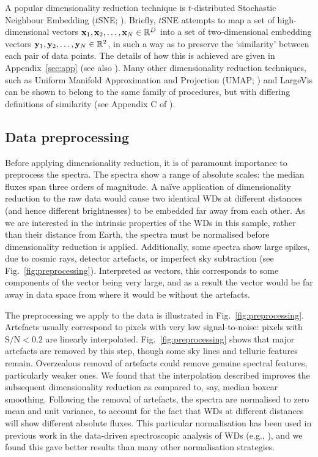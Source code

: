\documentclass[fleqn,usenatbib]{mnras}
\def\xb{\vb{x}}
\def\yb{\vb{y}}
\begin{document}
A popular dimensionality reduction technique is $t$-distributed Stochastic Neighbour Embedding ($t$SNE; \citealt{tsne}).
Briefly, $t$SNE attempts to map a set of high-dimensional vectors $\xb_1, \xb_2, \dots, \xb_N \in \mathbb{R}^D$ into a set of two-dimensional embedding vectors $\yb_1, \yb_2, \dots, \yb_N \in \mathbb{R}^2$, in such a way as to preserve the `similarity' between each pair of data points.
The details of how this is achieved are given in Appendix~\ref{sec:app} (see also \citealt{tsne}).
Many other dimensionality reduction techniques, such as Uniform Manifold Approximation and Projection (UMAP; \citealt{umap}) and LargeVis \citep{largevis} can be shown to belong to the same family of procedures, but with differing definitions of similarity (see Appendix C of \citealt{umap}).


\subsection{Data preprocessing}
\label{sec:preprocessing}

Before applying dimensionality reduction, it is of paramount importance to preprocess the spectra.
The spectra show a range of absolute scales: the median fluxes span three orders of magnitude.
A na\"{i}ve application of dimensionality reduction to the raw data would cause two identical WDs at different distances (and hence different brightnesses) to be embedded far away from each other.
As we are interested in the intrinsic properties of the WDs in this sample, rather than their distance from Earth, the spectra must be normalised before dimensionality reduction is applied.
Additionally, some spectra show large spikes, due to cosmic rays, detector artefacts, or imperfect sky subtraction (see Fig.~\ref{fig:preprocessing}).
Interpreted as vectors, this corresponds to some components of the vector being very large, and as a result the vector would be far away in data space from where it would be without the artefacts.

The preprocessing we apply to the data is illustrated in Fig.~\ref{fig:preprocessing}.
Artefacts usually correspond to pixels with very low signal-to-noise: pixels with $\mathrm{S}/\mathrm{N}<0.2$ are linearly interpolated.
Fig.~\ref{fig:preprocessing} shows that major artefacts are removed by this step, though some sky lines and telluric features remain.
Overzealous removal of artefacts could remove genuine spectral features, particularly weaker ones.
We found that the interpolation described improves the subsequent dimensionality reduction as compared to, say, median boxcar smoothing.
Following the removal of artefacts, the spectra are normalised to zero mean and unit variance, to account for the fact that WDs at different distances will show different absolute fluxes.
This particular normalisation has been used in previous work in the data-driven spectroscopic analysis of WDs (e.g., \citealt{vincent23}), and we found this gave better results than many other normalisation strategies.
\end{document}
